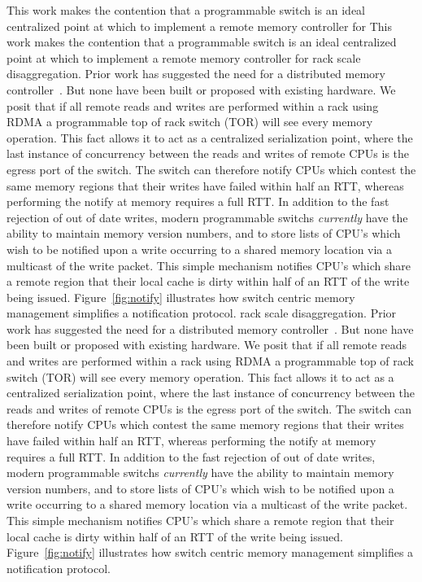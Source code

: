 This work makes the contention that a programmable switch is an ideal
centralized point at which to implement a remote memory controller for
This work makes the contention that a programmable switch is an ideal
centralized point at which to implement a remote memory controller for
rack scale disaggregation. Prior work has suggested the need for a
distributed memory controller~\cite{254120}. But none have been built
or proposed with existing hardware. We posit that if all remote reads
and writes are performed within a rack using RDMA a programmable top
of rack switch (TOR) will see every memory operation. This fact allows
it to act as a centralized serialization point, where the last
instance of concurrency between the reads and writes of remote CPUs is
the egress port of the switch. The switch can therefore notify CPUs
which contest the same memory regions that their writes have failed
within half an RTT, whereas performing the notify at memory requires a
full RTT. In addition to the fast rejection of out of date writes,
modern programmable switchs \textit{currently} have the ability to
maintain memory version numbers, and to store lists of CPU's which
wish to be notified upon a write occurring to a shared memory location
via a multicast of the write packet. This simple mechanism notifies
CPU's which share a remote region that their local cache is dirty
within half of an RTT of the write being issued.
Figure~\ref{fig:notify} illustrates how switch centric memory
management simplifies a notification protocol. 
rack scale disaggregation. Prior work has suggested the need for a
distributed memory controller~\cite{254120}. But none have been built
or proposed with existing hardware. We posit that if all remote reads
and writes are performed within a rack using RDMA a programmable top
of rack switch (TOR) will see every memory operation. This fact allows
it to act as a centralized serialization point, where the last
instance of concurrency between the reads and writes of remote CPUs is
the egress port of the switch. The switch can therefore notify CPUs
which contest the same memory regions that their writes have failed
within half an RTT, whereas performing the notify at memory requires a
full RTT. In addition to the fast rejection of out of date writes,
modern programmable switchs \textit{currently} have the ability to
maintain memory version numbers, and to store lists of CPU's which
wish to be notified upon a write occurring to a shared memory location
via a multicast of the write packet. This simple mechanism notifies
CPU's which share a remote region that their local cache is dirty
within half of an RTT of the write being issued.
Figure~\ref{fig:notify} illustrates how switch centric memory
management simplifies a notification protocol. 


